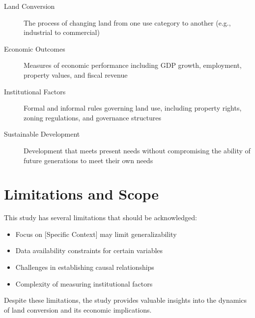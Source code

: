 \begin{description}
    \item[Land Conversion] The process of changing land from one use category to another (e.g., industrial to commercial)
    \item[Economic Outcomes] Measures of economic performance including GDP growth, employment, property values, and fiscal revenue
    \item[Institutional Factors] Formal and informal rules governing land use, including property rights, zoning regulations, and governance structures
    \item[Sustainable Development] Development that meets present needs without compromising the ability of future generations to meet their own needs
\end{description}

\section{Limitations and Scope}

This study has several limitations that should be acknowledged:

\begin{itemize}
    \item Focus on [Specific Context] may limit generalizability
    \item Data availability constraints for certain variables
    \item Challenges in establishing causal relationships
    \item Complexity of measuring institutional factors
\end{itemize}

Despite these limitations, the study provides valuable insights into the dynamics of land conversion and its economic implications.

\endinput